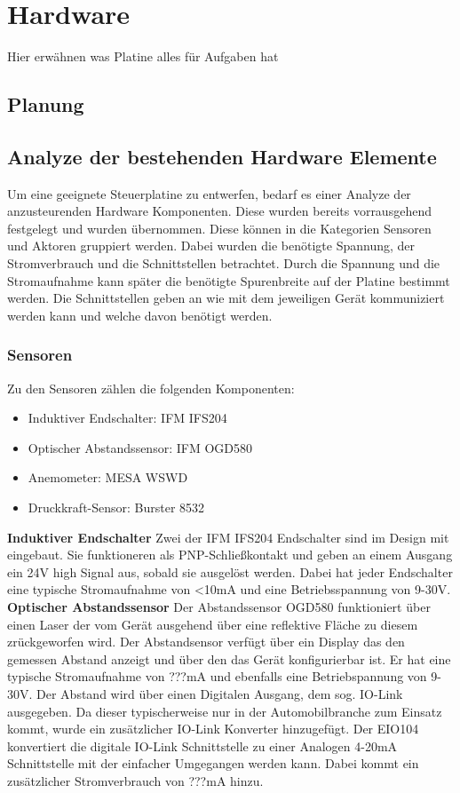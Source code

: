 \section{Hardware}
Hier erwähnen was Platine alles für Aufgaben hat
\subsection{Planung}
\subsection{Analyze der bestehenden Hardware Elemente}
Um eine geeignete Steuerplatine zu entwerfen, bedarf es einer Analyze der anzusteurenden Hardware Komponenten. Diese wurden bereits vorrausgehend festgelegt und wurden übernommen. Diese können in die Kategorien Sensoren und Aktoren gruppiert werden. Dabei wurden die benötigte Spannung, der Stromverbrauch und die Schnittstellen betrachtet. Durch die Spannung und die Stromaufnahme kann später die benötigte Spurenbreite auf der Platine bestimmt werden. Die Schnittstellen geben an wie mit dem jeweiligen Gerät kommuniziert werden kann und welche davon benötigt werden.\\

\subsubsection{Sensoren}
Zu den Sensoren zählen die folgenden Komponenten:
\begin{itemize}
	\item Induktiver Endschalter: IFM IFS204
	\item Optischer Abstandssensor: IFM OGD580
	\item Anemometer: MESA WSWD
	\item Druckkraft-Sensor: Burster 8532
\end{itemize}

\noindent\textbf{Induktiver Endschalter}\newline
Zwei der IFM IFS204 Endschalter sind im Design mit eingebaut. Sie funktioneren als PNP-Schließkontakt und geben an einem Ausgang ein 24V high Signal aus, sobald sie ausgelöst werden. Dabei hat jeder Endschalter eine typische Stromaufnahme von <10mA und eine Betriebsspannung von 9-30V.\\

\noindent\textbf{Optischer Abstandssensor}\newline
Der Abstandssensor OGD580 funktioniert über einen Laser der vom Gerät ausgehend über eine reflektive Fläche zu diesem zrückgeworfen wird. Der Abstandsensor verfügt über ein Display das den gemessen Abstand anzeigt und über den das Gerät konfigurierbar ist. Er hat eine typische Stromaufnahme von ???mA und ebenfalls eine Betriebspannung von 9-30V. Der Abstand wird über einen Digitalen Ausgang, dem sog. IO-Link ausgegeben. Da dieser typischerweise nur in der Automobilbranche zum Einsatz kommt, wurde ein zusätzlicher IO-Link Konverter hinzugefügt. Der EIO104 konvertiert die digitale IO-Link Schnittstelle zu einer Analogen 4-20mA Schnittstelle mit der einfacher Umgegangen werden kann. Dabei kommt ein zusätzlicher Stromverbrauch von ???mA hinzu.\\

